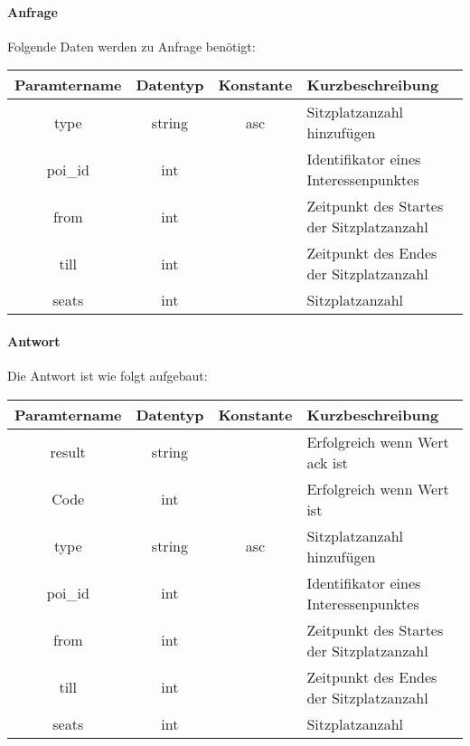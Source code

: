 \paragraph{Anfrage}Folgende Daten werden zu Anfrage benötigt:
\begin{table}[H]
	\begin{tabular}{|c|c|c|p{6.5cm}|}
		\hline
		\textbf{Paramtername} & \textbf{Datentyp} & \textbf{Konstante} & \textbf{Kurzbeschreibung}                                                                                               \\ \hline
		type                & string            & asc                & Sitzplatzanzahl hinzufügen \\ \hline
		poi\_id             & int               &                    & Identifikator eines Interessenpunktes \\ \hline
		from                & int               &                    & Zeitpunkt des Startes der Sitzplatzanzahl \\ \hline
		till                & int               &                    & Zeitpunkt des Endes der Sitzplatzanzahl \\ \hline
		seats               & int               &                    & Sitzplatzanzahl \\ \hline
	\end{tabular}
\end{table}
\paragraph{Antwort}Die Antwort ist wie folgt aufgebaut:
\begin{table}[H]
	\begin{tabular}{|c|c|c|p{6.5cm}|}
		\hline
		\textbf{Paramtername} & \textbf{Datentyp} & \textbf{Konstante} & \textbf{Kurzbeschreibung}                                                                                               \\ \hline
		result              & string           &                 & Erfolgreich wenn Wert {\glqq ack\grqq} ist \\ \hline
		Code                & int              &                 & Erfolgreich wenn Wert {\glqq 0\grqq} ist \\ \hline
		type                & string           & asc             & Sitzplatzanzahl hinzufügen \\ \hline
		poi\_id             & int              &                 & Identifikator eines Interessenpunktes \\ \hline
		from                & int              &                 & Zeitpunkt des Startes der Sitzplatzanzahl \\ \hline
		till                & int              &                 & Zeitpunkt des Endes der Sitzplatzanzahl \\ \hline
		seats               & int              &                 & Sitzplatzanzahl \\ \hline
	\end{tabular}
\end{table}
